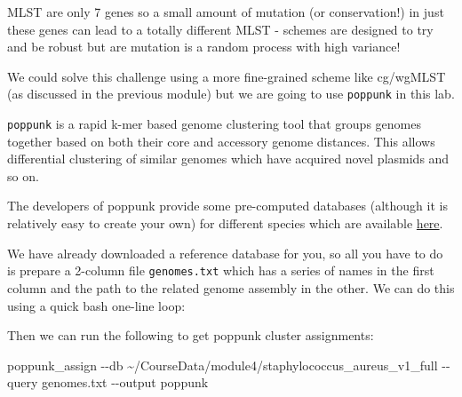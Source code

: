 \documentclass[
]{book}
\newenvironment{Shaded}{\begin{snugshade}}{\end{snugshade}}
\newcommand{\AttributeTok}[1]{\textcolor[rgb]{0.13,0.29,0.53}{#1}}
\newcommand{\BuiltInTok}[1]{#1}
\newcommand{\ControlFlowTok}[1]{\textcolor[rgb]{0.13,0.29,0.53}{\textbf{#1}}}
\newcommand{\ExtensionTok}[1]{#1}
\newcommand{\FunctionTok}[1]{\textcolor[rgb]{0.13,0.29,0.53}{\textbf{#1}}}
\newcommand{\KeywordTok}[1]{\textcolor[rgb]{0.13,0.29,0.53}{\textbf{#1}}}
\newcommand{\NormalTok}[1]{#1}
\newcommand{\OperatorTok}[1]{\textcolor[rgb]{0.81,0.36,0.00}{\textbf{#1}}}
\newcommand{\PreprocessorTok}[1]{\textcolor[rgb]{0.56,0.35,0.01}{\textit{#1}}}
\newcommand{\StringTok}[1]{\textcolor[rgb]{0.31,0.60,0.02}{#1}}
\newcommand{\VariableTok}[1]{\textcolor[rgb]{0.00,0.00,0.00}{#1}}
\begin{document}
MLST are only 7 genes so a small amount of mutation (or conservation!) in just these genes can lead to a totally different MLST - schemes are designed to try and be robust but are mutation is a random process with high variance!

We could solve this challenge using a more fine-grained scheme like cg/wgMLST (as discussed in the previous module) but we are going to use \texttt{poppunk} in this lab.

\texttt{poppunk} is a rapid k-mer based genome clustering tool that groups genomes together based on both their core and accessory genome distances. This allows differential clustering of similar genomes which have acquired novel plasmids and so on.

The developers of poppunk provide some pre-computed databases (although it is relatively easy to create your own) for different species which are available \href{https://www.bacpop.org/poppunk-databases/}{here}.

We have already downloaded a reference database for you, so all you have to do is prepare a 2-column file \texttt{genomes.txt} which has a series of names in the first column and the path to the related genome assembly in the other.
We can do this using a quick bash one-line loop:

\begin{Shaded}
\end{Shaded}

Then we can run the following to get poppunk cluster assignments:

\begin{Shaded}
\begin{Highlighting}[]
\ExtensionTok{poppunk\_assign} \AttributeTok{{-}{-}db}\NormalTok{ \textasciitilde{}/CourseData/module4/staphylococcus\_aureus\_v1\_full }\AttributeTok{{-}{-}query}\NormalTok{ genomes.txt }\AttributeTok{{-}{-}output}\NormalTok{ poppunk}
\end{Highlighting}
\end{Shaded}
\end{document}
